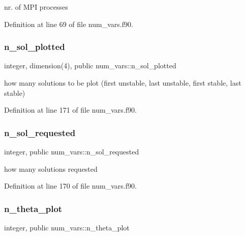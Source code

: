 nr. of M\+PI processes 



Definition at line 69 of file num\+\_\+vars.\+f90.

\mbox{\label{namespacenum__vars_a98df35edce5a42616685bb1ebd508c79}} 
\subsubsection{\texorpdfstring{n\+\_\+sol\+\_\+plotted}{n\_sol\_plotted}}
{\footnotesize\ttfamily integer, dimension(4), public num\+\_\+vars\+::n\+\_\+sol\+\_\+plotted}



how many solutions to be plot (first unstable, last unstable, first stable, last stable) 



Definition at line 171 of file num\+\_\+vars.\+f90.

\mbox{\label{namespacenum__vars_a3deb68d5c9cd3a99c9dd779e18c4d129}} 
\subsubsection{\texorpdfstring{n\+\_\+sol\+\_\+requested}{n\_sol\_requested}}
{\footnotesize\ttfamily integer, public num\+\_\+vars\+::n\+\_\+sol\+\_\+requested}



how many solutions requested 



Definition at line 170 of file num\+\_\+vars.\+f90.

\mbox{\label{namespacenum__vars_a0c3d2a6eea73c4d47f30df016475b585}} 
\subsubsection{\texorpdfstring{n\+\_\+theta\+\_\+plot}{n\_theta\_plot}}
{\footnotesize\ttfamily integer, public num\+\_\+vars\+::n\+\_\+theta\+\_\+plot}



